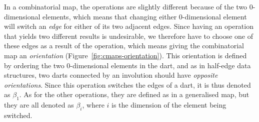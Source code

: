 In a combinatorial map, the operations are slightly different because of the two \(0\)-dimensional elements, which means that changing either \(0\)-dimensional element will switch an \emph{edge} for either of its two adjacent edges.
Since having an operation that yields two different results is undesirable, we therefore have to choose one of these edges as a result of the operation, which means giving the combinatorial map an \emph{orientation} (Figure~\ref{fig:cmaps-orientation}).
This orientation is defined by ordering the two \(0\)-dimensional elements in the dart, and as in half-edge data structures, two darts connected by an involution should have \emph{opposite orientations}.
Since this operation switches the edges of a dart, it is thus denoted as \(\beta_1\).
As for the other operations, they are defined as in a generalised map, but they are all denoted as \(\beta_i\), where \(i\) is the dimension of the element being switched.

